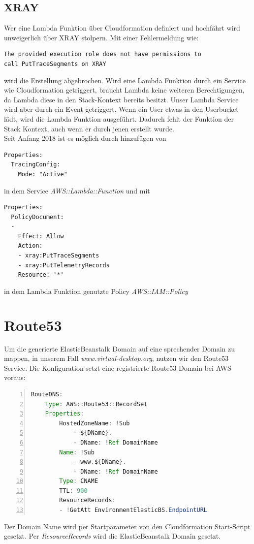 \documentclass[a4paper, 12pt]{scrreprt}
\renewcommand\_{\textunderscore\allowbreak}
\begin{document}
\subsection{XRAY}
Wer eine Lambda Funktion über Cloudformation definiert und hochfährt wird unweigerlich über XRAY stolpern. Mit einer Fehlermeldung wie: 
\bigskip
\begin{lstlisting}
The provided execution role does not have permissions to
call PutTraceSegments on XRAY
\end{lstlisting}
\bigskip
wird die Erstellung abgebrochen. Wird eine Lambda Funktion durch ein Service wie Cloudformation getriggert, braucht Lambda keine weiteren Berechtigungen, da Lambda diese in den Stack-Kontext bereits besitzt. Unser Lambda Service wird aber durch ein Event getriggert. Wenn ein User etwas in den Userbucket lädt, wird die Lambda Funktion ausgeführt. Dadurch fehlt der Funktion der Stack Kontext, auch wenn er durch jenen erstellt wurde. \\
Seit Anfang 2018 \cite{AWSDe} ist es möglich durch hinzufügen von
\begin{lstlisting}
Properties:
  TracingConfig:
    Mode: "Active"
\end{lstlisting} 
in dem Service \textit{AWS::Lambda::Function} und mit 
\begin{lstlisting}
Properties:
  PolicyDocument:
  -
    Effect: Allow
    Action:
    - xray:PutTraceSegments
    - xray:PutTelemetryRecords
    Resource: '*'
\end{lstlisting} 
in dem Lambda Funktion genutzte Policy \textit{AWS::IAM::Policy}

\section{Route53}
Um die generierte ElasticBeanstalk Domain auf eine sprechender Domain zu mappen, in unserem Fall \textit{www.virtual-desktop.org}, nutzen wir den Route53 Service. Die Konfiguration setzt eine registrierte Route53 Domain bei AWS voraus:
\bigskip
\begin{lstlisting}[xleftmargin=\parindent,numbers=left,numberstyle=\small,numbersep=8pt,frame=L,mathescape=true, basicstyle=\small, language=Java, lineskip={1.0pt}]
RouteDNS:
    Type: AWS::Route53::RecordSet
    Properties:
        HostedZoneName: !Sub
            - ${DName}.
            - DName: !Ref DomainName
        Name: !Sub
            - www.${DName}.
            - DName: !Ref DomainName
        Type: CNAME
        TTL: 900
        ResourceRecords:
        - !GetAtt EnvironmentElasticBS.EndpointURL
\end{lstlisting}
\bigskip
\noindent Der Domain Name wird per Startparameter von den Cloudformation Start-Script gesetzt. Per \textit{ResourceRecords} wird die ElasticBeanstalk Domain gesetzt.
 
\end{document}
